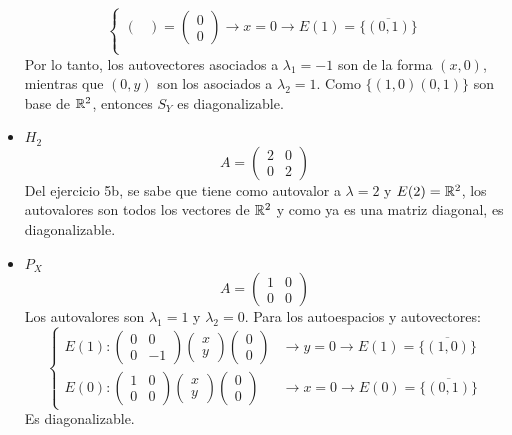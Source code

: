 \begin{mdframed}[style=s]
\begin{itemize}
\[\begin{cases}
\begin{pmatrix}
                    \end{pmatrix}=\begin{pmatrix}
                        0\\0
                    \end{pmatrix}\to x=0\to E(1)=\overline{\{(0,1)\}}\\
                \end{cases}\]
                Por lo tanto, los autovectores asociados a $\lambda_1=-1$ son de la forma $(x,0)$, mientras que $(0,y)$ son los asociados a $\lambda_2=1$. Como $\{(1,0)(0,1)\}$ son base de $\mathbb{R}^2$, entonces $S_Y$ es diagonalizable.
            \item $H_2$
                \[A=\begin{pmatrix}
                    2&0\\0&2
                \end{pmatrix}\]
                Del ejercicio 5b, se sabe que tiene como autovalor a $\lambda=2$ y $E(2)=\mathbb{R}^2$, los autovalores son todos los vectores de $\mathbb{R}^2$ y como ya es una matriz diagonal, es diagonalizable.
            \item $P_X$
                \[A=\begin{pmatrix}
                    1&0\\0&0
                \end{pmatrix}\]
                Los autovalores son $\lambda_1=1$ y $\lambda_2=0$. Para los autoespacios y autovectores:\[\begin{cases}
                    E(1):\begin{pmatrix}
                        0&0\\0&-1
                    \end{pmatrix}\begin{pmatrix}
                        x\\y
                    \end{pmatrix}\begin{pmatrix}
                        0\\0
                    \end{pmatrix}&\to y=0\to E(1)=\overline{\{(1,0)\}}\\
                    E(0):\begin{pmatrix}
                        1&0\\0&0
                    \end{pmatrix}\begin{pmatrix}
                        x\\y
                    \end{pmatrix}\begin{pmatrix}
                        0\\0
                    \end{pmatrix}&\to x=0\to E(0)=\overline{\{(0,1)\}}
                \end{cases}\]
                Es diagonalizable.
        \end{itemize}
    \end{mdframed}